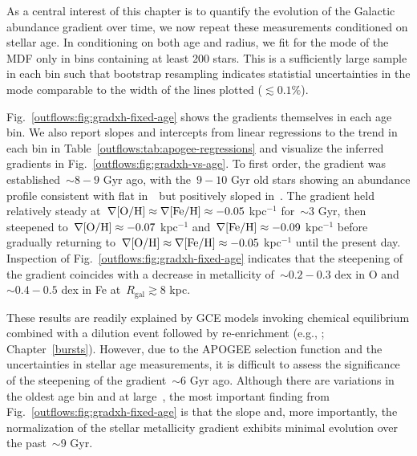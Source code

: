 As a central interest of this chapter is to quantify the evolution of the
Galactic abundance gradient over time, we now repeat these measurements
conditioned on stellar age.
In conditioning on both age and radius, we fit for the mode of the MDF only in
bins containing at least 200 stars.
This is a sufficiently large sample in each bin such that bootstrap resampling
indicates statistial uncertainties in the mode comparable to the width of the
lines plotted ($\lesssim0.1\%$).
\par
Fig.~\ref{outflows:fig:gradxh-fixed-age} shows the gradients themselves in each
age bin.
We also report slopes and intercepts from linear regressions to the trend in
each bin in Table~\ref{outflows:tab:apogee-regressions} and visualize the
inferred gradients in Fig.~\ref{outflows:fig:gradxh-vs-age}.
To first order, the gradient was established~$\sim$$8 - 9$ Gyr ago, with
the~$9 - 10$ Gyr old stars showing an abundance profile consistent with flat
in~\oh~but positively sloped in~\feh.
The gradient held relatively steady at~$\nabla\text{[O/H]} \approx \nabla\text{[Fe/H]} \approx
-0.05$ kpc$^{-1}$ for~$\sim$3 Gyr, then steepened to~$\nabla\text{[O/H]} \approx -0.07$
kpc$^{-1}$ and~$\nabla\text{[Fe/H]} \approx -0.09$ kpc$^{-1}$ before gradually returning
to~$\nabla\text{[O/H]} \approx \nabla\text{[Fe/H]} \approx -0.05$ kpc$^{-1}$ until the present day.
Inspection of Fig.~\ref{outflows:fig:gradxh-fixed-age} indicates that the
steepening of the gradient coincides with a decrease in metallicity
of~$\sim$$0.2 - 0.3$ dex in O and~$\sim$$0.4 - 0.5$ dex in Fe
at~$R_\text{gal} \gtrsim 8$ kpc.
\par
These results are readily explained by GCE models invoking chemical
equilibrium combined with a dilution event followed by re-enrichment (e.g.,
\citealt{Dalcanton2007}; Chapter~\ref{bursts}).
However, due to the APOGEE selection function and the uncertainties in stellar
age measurements, it is difficult to assess the significance of the steepening
of the gradient~$\sim$6 Gyr ago.
Although there are variations in the oldest age bin and at large~\rgal, the
most important finding from Fig.~\ref{outflows:fig:gradxh-fixed-age} is that
the slope and, more importantly, the normalization of the stellar metallicity
gradient exhibits minimal evolution over the past~$\sim$9 Gyr.

